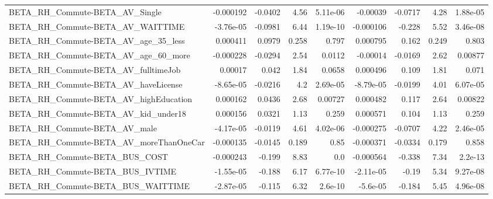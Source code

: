 \begin{tabular}{lrrrrrrrr}
BETA\_RH\_Commute-BETA\_AV\_Single                     &   -0.000192 &      -0.0402 &      4.56 & 5.11e-06 &   -0.00039 &     -0.0717 &         4.28 &      1.88e-05 \\
BETA\_RH\_Commute-BETA\_AV\_WAITTIME                   &   -3.76e-05 &      -0.0981 &      6.44 & 1.19e-10 &  -0.000106 &      -0.228 &         5.52 &      3.46e-08 \\
BETA\_RH\_Commute-BETA\_AV\_age\_35\_less                &    0.000411 &       0.0979 &     0.258 &    0.797 &   0.000795 &       0.162 &        0.249 &         0.803 \\
BETA\_RH\_Commute-BETA\_AV\_age\_60\_more                &   -0.000228 &      -0.0294 &      2.54 &   0.0112 &   -0.00014 &     -0.0169 &         2.62 &       0.00877 \\
BETA\_RH\_Commute-BETA\_AV\_fulltimeJob                &     0.00017 &        0.042 &      1.84 &   0.0658 &   0.000496 &       0.109 &         1.81 &         0.071 \\
BETA\_RH\_Commute-BETA\_AV\_haveLicense                &   -8.65e-05 &      -0.0216 &       4.2 & 2.69e-05 &  -8.79e-05 &     -0.0199 &         4.01 &      6.07e-05 \\
BETA\_RH\_Commute-BETA\_AV\_highEducation              &    0.000162 &       0.0436 &      2.68 &  0.00727 &   0.000482 &       0.117 &         2.64 &       0.00822 \\
BETA\_RH\_Commute-BETA\_AV\_kid\_under18                &    0.000156 &       0.0321 &      1.13 &    0.259 &   0.000571 &       0.104 &         1.13 &         0.259 \\
BETA\_RH\_Commute-BETA\_AV\_male                       &   -4.17e-05 &      -0.0119 &      4.61 & 4.02e-06 &  -0.000275 &     -0.0707 &         4.22 &      2.46e-05 \\
BETA\_RH\_Commute-BETA\_AV\_moreThanOneCar             &   -0.000135 &      -0.0145 &     0.189 &     0.85 &  -0.000371 &     -0.0334 &        0.179 &         0.858 \\
BETA\_RH\_Commute-BETA\_BUS\_COST                      &   -0.000243 &       -0.199 &      8.83 &      0.0 &  -0.000564 &      -0.338 &         7.34 &       2.2e-13 \\
BETA\_RH\_Commute-BETA\_BUS\_IVTIME                    &   -1.55e-05 &       -0.188 &      6.17 & 6.77e-10 &  -2.11e-05 &       -0.19 &         5.34 &      9.27e-08 \\
BETA\_RH\_Commute-BETA\_BUS\_WAITTIME                  &   -2.87e-05 &       -0.115 &      6.32 &  2.6e-10 &   -5.6e-05 &      -0.184 &         5.45 &      4.96e-08 \\

\end{tabular}
